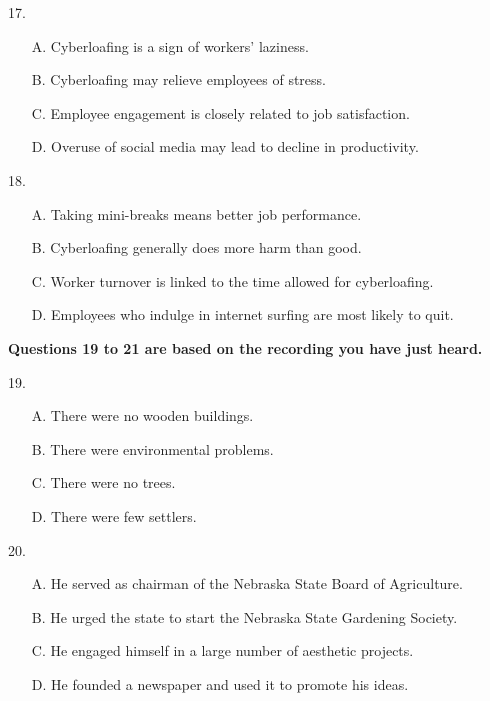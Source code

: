 \documentclass[UTF8,11pt]{ctexart}
\begin{document}
17.


\begin{itemize}[leftmargin=2em,itemsep=.2em,topsep=.4em]\item[A.] Cyberloafing is a sign of workers’ laziness.
\item[B.] Cyberloafing may relieve employees of stress.
\item[C.] Employee engagement is closely related to job satisfaction.
\item[D.] Overuse of social media may lead to decline in productivity.
\end{itemize}

18.


\begin{itemize}[leftmargin=2em,itemsep=.2em,topsep=.4em]\item[A.] Taking mini-breaks means better job performance.
\item[B.] Cyberloafing generally does more harm than good.
\item[C.] Worker turnover is linked to the time allowed for cyberloafing.
\item[D.] Employees who indulge in internet surfing are most likely to quit.
\end{itemize}

\textbf{Questions 19 to 21 are based on the recording you have just heard.}


19.


\begin{itemize}[leftmargin=2em,itemsep=.2em,topsep=.4em]\item[A.] There were no wooden buildings.
\item[B.] There were environmental problems.
\item[C.] There were no trees.
\item[D.] There were few settlers.
\end{itemize}

20.


\begin{itemize}[leftmargin=2em,itemsep=.2em,topsep=.4em]\item[A.] He served as chairman of the Nebraska State Board of Agriculture.
\item[B.] He urged the state to start the Nebraska State Gardening Society.
\item[C.] He engaged himself in a large number of aesthetic projects.
\item[D.] He founded a newspaper and used it to promote his ideas.
\end{itemize}
\end{document}
